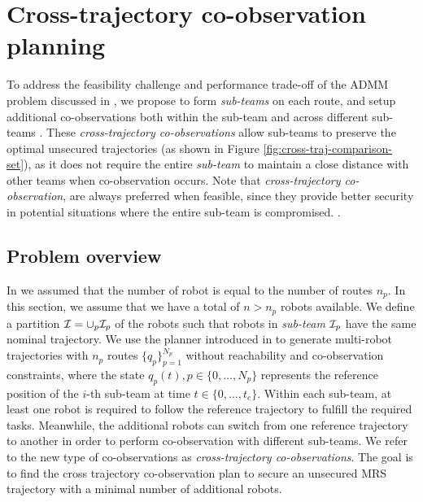 \documentclass[journal]{IEEEtran}  %
\begin{document}
\section{Cross-trajectory co-observation planning}

To address the feasibility challenge and performance trade-off of the ADMM problem discussed in , we propose to form \emph{sub-teams} on each route, and setup additional co-observations both within the sub-team and across different sub-teams . 
These \emph{cross-trajectory co-observations} allow sub-teams to preserve the optimal unsecured trajectories (as shown in Figure \ref{fig:cross-traj-comparison-set}), as it does not require the entire \emph{sub-team} to maintain a close distance with other teams when co-observation occurs. 
Note that \emph{cross-trajectory co-observation}, are always preferred when feasible, since they provide better security in potential situations where the entire sub-team is compromised. .



\subsection{Problem overview}


In  we assumed that the number of robot is equal to the number of routes $n_p$.
In this section, we  assume that we have a total of $n>n_p$ robots  available.  We define a partition $\mathcal{I}=\cup_p \mathcal{I}_p$ of the robots such that robots in \emph{sub-team} $\mathcal{I}_p$ have the same nominal trajectory. We use the planner introduced in   to generate multi-robot trajectories with $n_p$ routes $\{q_p\}_{p=1}^{N_p}$ without reachability and co-observation constraints, where the state $q_p(t), p \in\{0,\ldots,N_{p}\}$ represents the reference position of the $i$-th sub-team at time $t\in\{0, \dots, t_{e}\}$. 
Within each sub-team, at least one robot is required to follow the reference trajectory to fulfill the required tasks. Meanwhile, the additional robots can switch from one reference trajectory to another in order to perform co-observation with different sub-teams. \rtron{$\star$}
We refer to the new type of co-observations as \emph{cross-trajectory co-observations}. The goal is to find the cross trajectory co-observation plan to secure an unsecured MRS trajectory with a minimal number of additional robots. 
\end{document}
